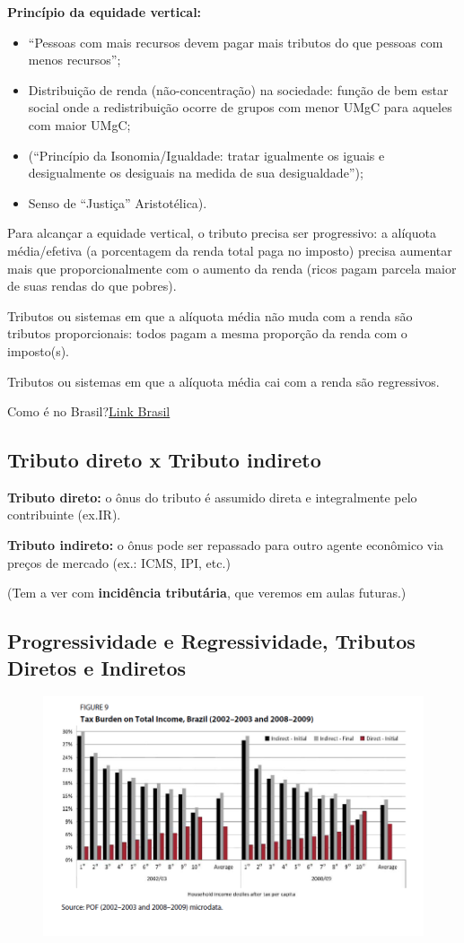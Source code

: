 \documentclass[a4paper,12pt]{article}[abntex2]
\begin{document}
\textbf{Princípio da equidade vertical:}
\begin{itemize}
  \item ``Pessoas com mais recursos devem pagar mais tributos do que pessoas com menos recursos'';
  \item Distribuição de renda (não-concentração) na sociedade: função de bem estar social onde a redistribuição ocorre de grupos com menor UMgC para aqueles com maior UMgC;
  \item (``Princípio da Isonomia/Igualdade: tratar igualmente os iguais e desigualmente os desiguais na medida de sua desigualdade'');
  \item Senso de ``Justiça'' Aristotélica).
\end{itemize}

Para alcançar a equidade vertical, o tributo precisa ser progressivo: a alíquota média/efetiva (a porcentagem da renda total paga no imposto) precisa aumentar mais que proporcionalmente com o aumento da renda (ricos pagam parcela maior de suas rendas do que pobres).

Tributos ou sistemas em que a alíquota média não muda com a renda são tributos proporcionais: todos pagam a mesma proporção da renda com o imposto(s).

Tributos ou sistemas em que a alíquota média cai com a renda são regressivos.

Como é no Brasil?\href{http://idg.receita.fazenda.gov.br/acesso-rapido/tributos/irpf-imposto-de-renda-pessoa-fisica#c-lculo-anual-do-irpf}{Link Brasil}

\subsection{\textbf{Tributo direto x Tributo indireto}}
\textbf{Tributo direto:} o ônus do tributo é assumido direta e integralmente pelo contribuinte (ex.IR).

\textbf{Tributo indireto:} o ônus pode ser repassado para outro agente econômico via preços de mercado (ex.: ICMS, IPI, etc.)

(Tem a ver com \textbf{incidência  tributária}, que veremos em aulas futuras.)

\subsection{\textbf{Progressividade e Regressividade, Tributos Diretos e Indiretos}}
\begin{figure}[H]
    \centering
    \includegraphics[width=0.7\linewidth]{Imagens/a18i9.png}
\end{figure}
\end{document}
